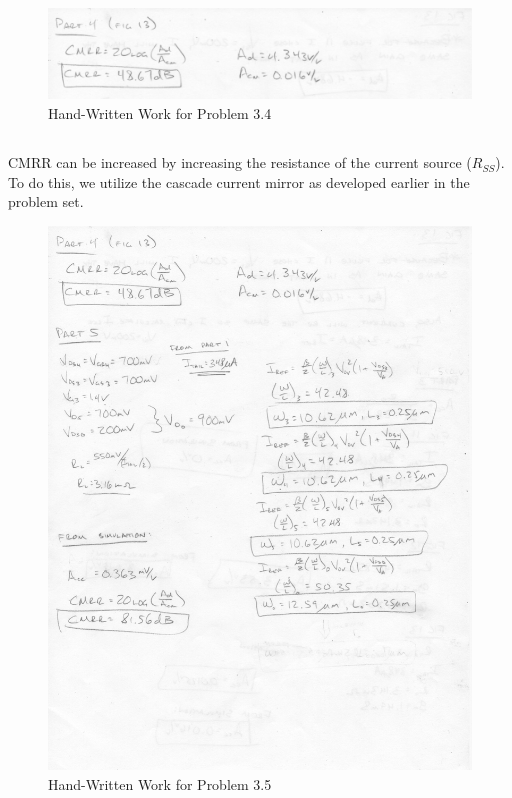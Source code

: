 \documentclass{article}
\begin{document}
\subsection{}

\begin{figure}[H]
\centering
\includegraphics[width=6in]{1_11a}
\caption{Hand-Written Work for Problem 3.4}
\label{3_4}
\end{figure}
\newpage

\subsection{}
CMRR can be increased by increasing the resistance of the current source ($R_{SS}$). To do this, we utilize the cascade current mirror as developed earlier in the problem set.

\begin{figure}[H]
\centering
\includegraphics[width=6in]{1_11}
\caption{Hand-Written Work for Problem 3.5}
\label{3_5}
\end{figure}
\end{document}

